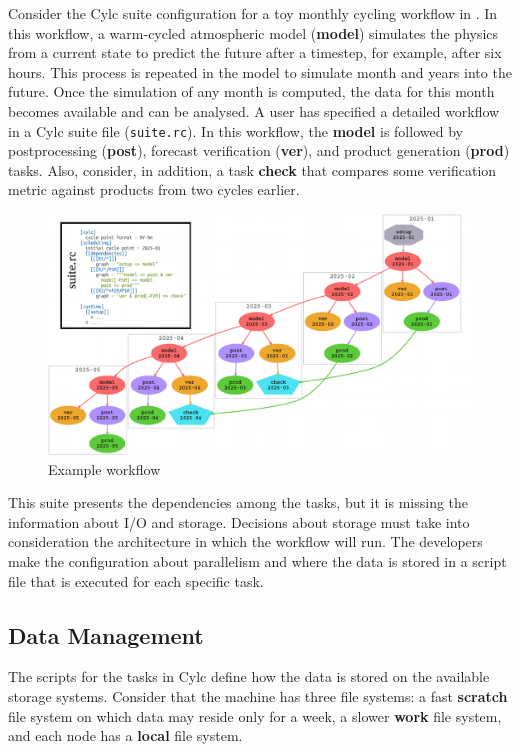 \documentclass[a4paper]{article}
\begin{document}
Consider the Cylc suite configuration for a toy monthly cycling workflow in .
In this workflow, a warm-cycled atmospheric model (\textbf{model}) simulates the physics from a current state to predict the future after a timestep, for example, after six hours.
This process is repeated in the model to simulate month and years into the future.
Once the simulation of any month is computed, the data for this month becomes available and can be analysed.
A user has specified a detailed workflow in a Cylc suite file (\texttt{suite.rc}).
In this workflow, the \textbf{model} is followed by postprocessing (\textbf{post}), forecast verification (\textbf{ver}), and product generation (\textbf{prod}) tasks.
Also, consider, in addition, a task \textbf{check} that compares some verification metric against products from two cycles earlier.

\begin{figure}[H]
  \centering
  \includegraphics[width=0.9\columnwidth]{cylc1}
  \caption{Example workflow\cite{8675433}}
  \label{fig:cylc}
\end{figure}

This suite presents the dependencies among the tasks, but it is missing the information about I/O and storage.
Decisions about storage must take into consideration the architecture in which the workflow will run.
The developers make the configuration about parallelism and where the data is stored in a script file that is executed for each specific task.

\subsection{Data Management}
\label{sec:datamanagement}

The scripts for the tasks in Cylc define how the data is stored on the available storage systems.
Consider that the machine has three file systems: a fast \textbf{scratch} file system on which data may reside only for a week, a slower \textbf{work} file system, and each node has a \textbf{local} file system.
\end{document}
